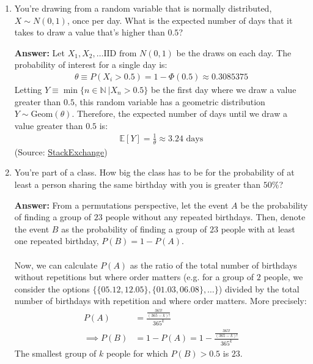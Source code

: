 \documentclass{article}
\newenvironment{QandA}{\begin{enumerate}[label=\arabic*.]}{\end{enumerate}}
\newenvironment{answer}{\par\normalfont \textbf{Answer:}}{}
\newcommand{\N}{\mathbb{N}}
\newcommand{\Exp}[1]{\mathbb{E}\left[ #1 \right]}
\newcommand{\g}{\vert}
\begin{document}
\begin{QandA}
    \item You're drawing from a random variable that is normally distributed, $X \sim N(0, 1)$, once per day. What is the expected number of days that it takes to draw a value that's higher than $0.5$?
    \begin{answer}
        Let $X_1, X_2, \ldots \text{IID from } N(0, 1)$ be the draws on each day. The probability of interest for a single day is:
        \begin{align*}
            \theta \equiv P(X_i > 0.5) = 1 - \Phi(0.5) \approx 0.3085375
        \end{align*}
        Letting $Y \equiv \min \{ n \in \N\ \g X_n > 0.5\}$ be the first day where we draw a value greater than $0.5$, this random variable has a geometric distribution $Y \sim \text{Geom}(\theta)$. Therefore, the expected number of days until we draw a value greater than $0.5$ is:
        \begin{align*}
            \Exp{Y} = \frac{1}{\theta} \approx 3.24 \text{ days}
        \end{align*}
        (Source: \href{https://stats.stackexchange.com/questions/410929/expected-number-of-days}{StackExchange})
    \end{answer}
    \item You’re part of a class. How big the class has to be for the probability of at least a person sharing the same birthday with you is greater than $50\%$?
    \begin{answer}
        From a permutations perspective, let the event $A$ be the probability of finding a group of $23$ people without any repeated birthdays. Then, denote the event $B$ as the probability of finding a group of $23$ people with at least one repeated birthday, $P(B) = 1 -P(A)$. \\\\
        Now, we can calculate $P(A)$ as the ratio of the total number of birthdays without repetitions but where order matters (e.g. for a group of $2$ people, we consider the options $\{ \{05.12, 12.05\}, \{01.03, 06.08 \}, \ldots \}$) divided by the total number of birthdays with repetition and where order matters. More precisely:
        \begin{align*}
            P(A) &= \frac{\frac{365!}{(365-k)!}}{365^k} \\
            \implies P(B) &= 1 - P(A) = 1 - \frac{\frac{365!}{(365-k)!}}{365^k}
        \end{align*}
        The smallest group of $k$ people for which $P(B) > 0.5$ is $23$.


\end{answer}
\end{QandA}
\end{document}
